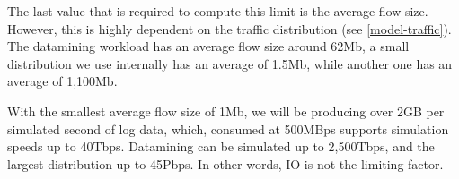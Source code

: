The last value that is required to compute this limit is the average flow size.
However, this is highly dependent on the traffic distribution (see \ref{model-traffic}).
The datamining workload has an average flow size around 62Mb, a small distribution we use internally has an average of 1.5Mb, while another one has an average of 1,100Mb.

With the smallest average flow size of 1Mb, we will be producing over 2GB per simulated second of log data, which, consumed at 500MBps supports simulation speeds up to 40Tbps.
Datamining can be simulated up to 2,500Tbps, and the largest distribution up to 45Pbps.
In other words, IO is not the limiting factor.


